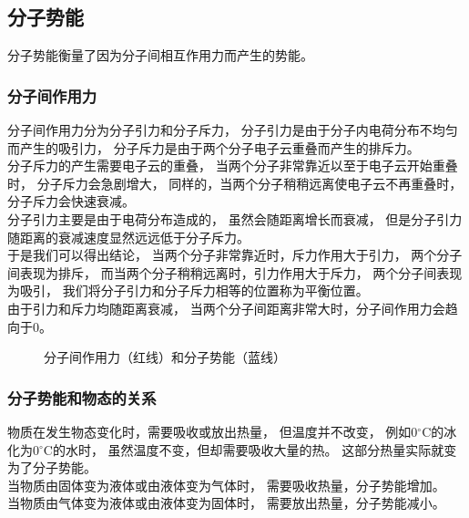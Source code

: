 \documentclass[UTF8]{ctexart}
\begin{document}
\newpage

\subsection{分子势能}
    分子势能衡量了因为分子间相互作用力而产生的势能。

\subsubsection{分子间作用力}
    分子间作用力分为分子引力和分子斥力，
    分子引力是由于分子内电荷分布不均匀而产生的吸引力，
    分子斥力是由于两个分子电子云重叠而产生的排斥力。\\[3mm]
    分子斥力的产生需要电子云的重叠，
    当两个分子非常靠近以至于电子云开始重叠时，
    分子斥力会急剧增大，
    同样的，当两个分子稍稍远离使电子云不再重叠时，
    分子斥力会快速衰减。\\[3mm]
    分子引力主要是由于电荷分布造成的，
    虽然会随距离增长而衰减，
    但是分子引力随距离的衰减速度显然远远低于分子斥力。\\[3mm]
    于是我们可以得出结论，
    当两个分子非常靠近时，斥力作用大于引力，
    两个分子间表现为排斥，
    而当两个分子稍稍远离时，引力作用大于斥力，
    两个分子间表现为吸引，
    我们将分子引力和分子斥力相等的位置称为平衡位置。\\[3mm]
    由于引力和斥力均随距离衰减，
    当两个分子间距离非常大时，分子间作用力会趋向于$0$。\\
    \begin{figure}[h]
        \begin{center}
            \caption{分子间作用力（红线）和分子势能（蓝线）}
        \end{center}
    \end{figure}

\subsubsection{分子势能和物态的关系}
    物质在发生物态变化时，需要吸收或放出热量，
    但温度并不改变，
    例如0$^\circ$C的冰化为0$^\circ$C的水时，
    虽然温度不变，但却需要吸收大量的热。
    这部分热量实际就变为了分子势能。\\[3mm]
    当物质由固体变为液体或由液体变为气体时，
    需要吸收热量，分子势能增加。\\[3mm]
    当物质由气体变为液体或由液体变为固体时，
    需要放出热量，分子势能减小。
\end{document}
